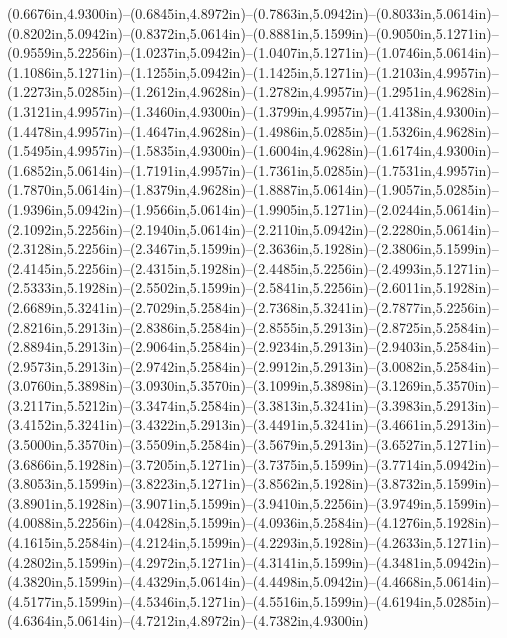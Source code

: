 (0.6676in,4.9300in)--(0.6845in,4.8972in)--(0.7863in,5.0942in)--(0.8033in,5.0614in)--(0.8202in,5.0942in)--(0.8372in,5.0614in)--(0.8881in,5.1599in)--(0.9050in,5.1271in)--(0.9559in,5.2256in)--(1.0237in,5.0942in)--(1.0407in,5.1271in)--(1.0746in,5.0614in)--(1.1086in,5.1271in)--(1.1255in,5.0942in)--(1.1425in,5.1271in)--(1.2103in,4.9957in)--(1.2273in,5.0285in)--(1.2612in,4.9628in)--(1.2782in,4.9957in)--(1.2951in,4.9628in)--(1.3121in,4.9957in)--(1.3460in,4.9300in)--(1.3799in,4.9957in)--(1.4138in,4.9300in)--(1.4478in,4.9957in)--(1.4647in,4.9628in)--(1.4986in,5.0285in)--(1.5326in,4.9628in)--(1.5495in,4.9957in)--(1.5835in,4.9300in)--(1.6004in,4.9628in)--(1.6174in,4.9300in)--(1.6852in,5.0614in)--(1.7191in,4.9957in)--(1.7361in,5.0285in)--(1.7531in,4.9957in)--(1.7870in,5.0614in)--(1.8379in,4.9628in)--(1.8887in,5.0614in)--(1.9057in,5.0285in)--(1.9396in,5.0942in)--(1.9566in,5.0614in)--(1.9905in,5.1271in)--(2.0244in,5.0614in)--(2.1092in,5.2256in)--(2.1940in,5.0614in)--(2.2110in,5.0942in)--(2.2280in,5.0614in)--(2.3128in,5.2256in)--(2.3467in,5.1599in)--(2.3636in,5.1928in)--(2.3806in,5.1599in)--(2.4145in,5.2256in)--(2.4315in,5.1928in)--(2.4485in,5.2256in)--(2.4993in,5.1271in)--(2.5333in,5.1928in)--(2.5502in,5.1599in)--(2.5841in,5.2256in)--(2.6011in,5.1928in)--(2.6689in,5.3241in)--(2.7029in,5.2584in)--(2.7368in,5.3241in)--(2.7877in,5.2256in)--(2.8216in,5.2913in)--(2.8386in,5.2584in)--(2.8555in,5.2913in)--(2.8725in,5.2584in)--(2.8894in,5.2913in)--(2.9064in,5.2584in)--(2.9234in,5.2913in)--(2.9403in,5.2584in)--(2.9573in,5.2913in)--(2.9742in,5.2584in)--(2.9912in,5.2913in)--(3.0082in,5.2584in)--(3.0760in,5.3898in)--(3.0930in,5.3570in)--(3.1099in,5.3898in)--(3.1269in,5.3570in)--(3.2117in,5.5212in)--(3.3474in,5.2584in)--(3.3813in,5.3241in)--(3.3983in,5.2913in)--(3.4152in,5.3241in)--(3.4322in,5.2913in)--(3.4491in,5.3241in)--(3.4661in,5.2913in)--(3.5000in,5.3570in)--(3.5509in,5.2584in)--(3.5679in,5.2913in)--(3.6527in,5.1271in)--(3.6866in,5.1928in)--(3.7205in,5.1271in)--(3.7375in,5.1599in)--(3.7714in,5.0942in)--(3.8053in,5.1599in)--(3.8223in,5.1271in)--(3.8562in,5.1928in)--(3.8732in,5.1599in)--(3.8901in,5.1928in)--(3.9071in,5.1599in)--(3.9410in,5.2256in)--(3.9749in,5.1599in)--(4.0088in,5.2256in)--(4.0428in,5.1599in)--(4.0936in,5.2584in)--(4.1276in,5.1928in)--(4.1615in,5.2584in)--(4.2124in,5.1599in)--(4.2293in,5.1928in)--(4.2633in,5.1271in)--(4.2802in,5.1599in)--(4.2972in,5.1271in)--(4.3141in,5.1599in)--(4.3481in,5.0942in)--(4.3820in,5.1599in)--(4.4329in,5.0614in)--(4.4498in,5.0942in)--(4.4668in,5.0614in)--(4.5177in,5.1599in)--(4.5346in,5.1271in)--(4.5516in,5.1599in)--(4.6194in,5.0285in)--(4.6364in,5.0614in)--(4.7212in,4.8972in)--(4.7382in,4.9300in)
